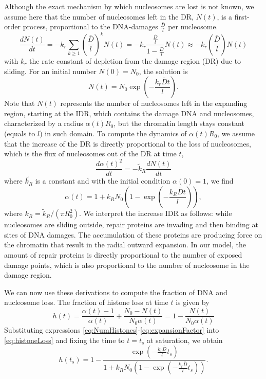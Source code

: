 \documentclass[12pt]{article}
\begin{document}
Although the exact mechanism by which nucleosomes are lost is not known, we assume here that the number of nucleosomes left in the DR, $N(t)$, is a first-order process, proportional to the DNA-damages $\frac{\bar{D}}{l}$ per nucleosome.
\begin{equation*}
\frac{dN(t)}{dt} = -k_r\sum_{k\geq 1} (\frac{\bar{D}}{l})^kN(t)=-k_r \frac{\frac{\bar{D}}{l}}{1-\frac{\bar{D}}{l}}N(t) \approx -k_r (\frac{\bar{D}}{l})N(t)
\end{equation*}
with $k_r$ the rate constant of depletion from the damage region (DR) due to sliding. For an initial number $N(0) = N_0$, the solution is
\begin{equation}\label{eq:NumHistones}
N(t) = N_0\exp(-\frac{k_r\bar{D}t}{l}).
\end{equation}
Note that $N(t)$ represents the number of nucleosomes left in the expanding region, starting at the IDR, which contains the damage DNA and nucleosomes, characterized by a radius $\alpha(t)R_0$, but the chromatin length stays constant (equals to $l$) in such domain. To compute the dynamics of $\alpha(t)R_0$, we assume that the increase of the DR is directly proportional to the loss of nucleosomes, which is the flux of nucleosomes out of the DR at time $t$,
\begin{equation}\label{dralpha}
\frac{d\alpha(t)^2}{dt}=-\tilde{k}_R\frac{dN(t)}{dt}
\end{equation}
where $\tilde{k_R}$ is a constant and with the initial condition $\alpha(0)=1$, we find 
\begin{equation}\label{eq:expansionFactor}
\alpha(t) = 1+k_RN_0(1-\exp(-\frac{k_R \bar{D}t}{l})),
\end{equation}
where $k_R = \tilde{k}_R/(\pi R_0^2)$. We interpret the increase IDR as follows: while nucleosomes are sliding outside, repair proteins are invading and then binding at sites of DNA damages. The accumulation of these proteins are producing force on the chromatin that result in the radial outward expansion. In our model, the amount of repair proteins is directly proportional to the number of exposed damage points, which is also proportional to the number of nucleosome in the damage region.

We can now use these derivations to compute the fraction of DNA and nucleosome loss. The fraction of histone loss at time $t$ is given by
\begin{equation}\label{eq:histoneLoss}
h(t) = \frac{\alpha(t)-1}{\alpha(t)} +\frac{N_0-N(t)}{N_0\alpha(t)}=1-\frac{N(t)}{N_0\alpha(t)}
\end{equation}
Substituting expressions \ref{eq:NumHistones}-\ref{eq:expansionFactor} into \ref{eq:histoneLoss} and fixing the time to $t=t_s$ at saturation, we obtain
\begin{equation}\label{eq:totalHistoneLoss}
h(t_s)=1-\frac{\exp(-\frac{k_r\bar{D}}{l}t_s)}{ 1+k_RN_0(1-\exp(-\frac{k_r\bar{D}}{l}t_s))}.
\end{equation}
\end{document}
